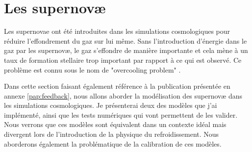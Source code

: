 \section{Les supernovæ}


Les supernovae ont été introduites dans les simulations cosmologiques pour réduire l'effondrement du gaz sur lui même.
Sans l'introduction d'énergie dans le gaz par les supernovæ, le gaz s'effondre de manière importante et cela mène à un taux de formation stellaire trop important par rapport à ce qui est observé.
Ce problème est connu sous le nom de "overcooling problem" \citep{2003ApJ...599...38B, 1992A&A...264..365B}.

Dans cette section faisant également référence à la publication présentée en annexe \ref{pap:feedback}, nous allons aborder la modélisation des supernovæ dans les simulations cosmologiques.
Je présenterai deux des modèles que j'ai implémenté, ainsi que les tests numériques qui vont permettent de les valider.
Nous verrons que ces modèles sont équivalent dans un contexte idéal mais divergent lors de l'introduction de la physique du refroidissement.
Nous aborderons également la problématique de la calibration de ces modèles.


%
%


